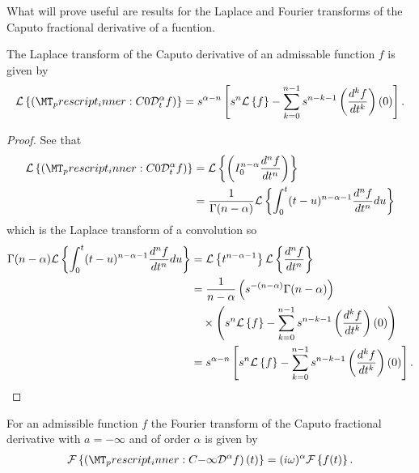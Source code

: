 What will prove useful are results for the Laplace and Fourier transforms of the Caputo fractional derivative of a fucntion.
\begin{mdframed}[innertopmargin=10pt]
\begin{lemma}
\label{lem:cap_laplace}
    The Laplace transform of the Caputo derivative of an admissable function $ f $ is given by
    \begin{align*}
        \laplace{\capder{0}{t}{\alpha}{f}} = s^{\alpha - n} \left[ s^n \laplace{f} - \sum_{k=0}^{n-1} s^{n-k-1} \left( \der{f}{t}{k} \right)(0) \right].
    \end{align*}
\end{lemma}
\end{mdframed}
\begin{proof}
    See that
    \begin{align*}
        \laplace{\capder{0}{t}{\alpha}{f}} &= \laplace{  \rli{0}{n-\alpha}{\der{f}{t}{n}}} \\
            &= \frac{1}{\Gamma(n-\alpha)}\laplace{ \int_0^t (t-u)^{n-\alpha-1} \der{f}{t}{n} du} \\ 
    \end{align*}
    which is the Laplace transform of a convolution so
    \begin{align*}
        \Gamma(n-\alpha)\mathcal{L} \left\{  \int_0^t (t-u)^{n-\alpha-1} \frac{d^{n}f}{dt^{n}} du \right\} &= \mathcal{L} \left\{ t^{n-\alpha-1} \right\} \mathcal{L} \left\{ \frac{d^{n}f}{dt^{n}} \right\} \\
        &= \frac{1}{n-\alpha} \left( s^{-(n-\alpha)} \Gamma(n-\alpha) \right) \\
        & \ \ \ \times \left( s^n \mathcal{L} \left\{ f \right\} - \sum_{k=0}^{n-1} s^{n-k-1} \left( \frac{d^{k}f}{dt^{k}} \right)(0) \right) \\
        &= s^{\alpha - n} \left[ s^n \mathcal{L} \left\{ f \right\} - \sum_{k=0}^{n-1} s^{n-k-1} \left( \frac{d^{k}f}{dt^{k}} \right)(0) \right].
    \end{align*}
\end{proof}
\begin{mdframed}[innertopmargin=10pt]
\begin{lemma}
    \label{lem:cap_fourier}
    For an admissible function $ f $ the Fourier transform of the Caputo fractional derivative with $ a = -\infty $ and of order $ \alpha $ is given by
    \begin{align*}
        \mathcal{F}\left\{ \left(\prescript{C}{-\infty}{\mathcal{D}}^\alpha f\right)(t) \right\} = (i\omega)^{\alpha} \mathcal{F}\left\{ f(t) \right\}.
    \end{align*}
\end{lemma}
\end{mdframed}
